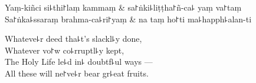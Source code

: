 \begin{twochants}
  Yaṃ-kiñci si꜕thi꜓laṃ kammaṃ & sa꜓ṅki꜕liṭṭha꜓ñ-ca꜕ yaṃ va꜓taṃ \\
  Sa꜓ṅka꜕ssaraṃ brahma-ca꜕ri꜓yaṃ & na taṃ ho꜓ti ma꜕happh꜕alan-ti \\
\end{twochants}

\begin{english}
  Whateve꜕r deed tha꜕t's slackl꜕y done,\\
  Whatever vo꜓w co꜕rruptl꜕y kept,\\
  The Holy Life le꜕d in꜕ doubtf꜕ul ways ---\\
  All these will ne꜓ve꜕r bear gr꜕eat fruits.
\end{english}


